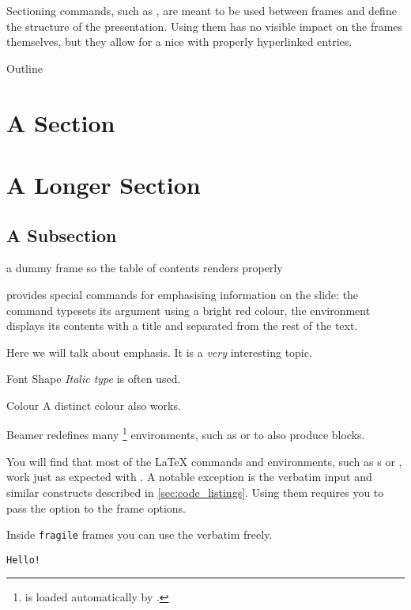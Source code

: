 Sectioning commands, such as , are meant to be used between frames
and define the structure of the presentation. Using them has no visible impact
on the frames themselves, but they allow for a  nice  with
properly hyperlinked entries.
\begin{example}
\begin{frame}{Outline}
  \tableofcontents
\end{frame}

\section{A Section}
\begin{frame}
\end{frame}
\section{A Longer Section}
\subsection{A Subsection}
\begin{frame}
  a dummy frame so the table of contents renders properly
\end{frame}
\end{example}

 provides special commands for emphasising information on the slide:
the  command typesets its argument using a bright red colour, the
 environment displays its contents with a title and separated from
the rest of the text.
\begin{example}
\begin{frame} %
Here we will talk about
\alert{emphasis}. It is a
\emph{very} interesting topic.
\begin{block}{Font Shape}
  \emph{Italic type} is often
  used.
\end{block}
\begin{block}{Colour}
  A distinct \alert{colour}
  also works.
\end{block}
\end{frame} %
\end{example}
Beamer redefines many \footnote{ is loaded
  automatically by .} environments, such as  or
 to also produce blocks.

You will find that most of the \LaTeX{} commands and environments, such as
s or , work just as expected with . A notable
exception is the verbatim input and similar constructs described in
\autoref{sec:code_listings}. Using them requires you to pass the
 option to the frame options.
\begin{example}
\begin{frame}[fragile]
  Inside \verb|fragile| frames
  you can use the verbatim
  freely.
  \begin{verbatim}
Hello!
  \end{verbatim}
\end{frame}
\end{example}

